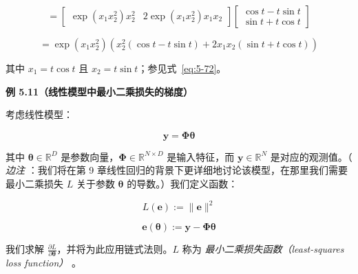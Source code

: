 \begin{notebox}
\begin{equation}
= \begin{bmatrix} \exp(x_1 x_2^2) x_2^2 & 2\exp(x_1 x_2^2) x_1 x_2 \end{bmatrix} \begin{bmatrix} \cos t - t\sin t \\ \sin t + t\cos t \end{bmatrix}
\tag{5.74b}\label{eq:5-74b}
\end{equation}

\begin{equation}
= \exp(x_1 x_2^2) \left( x_2^2(\cos t - t\sin t) + 2x_1 x_2(\sin t + t\cos t) \right)
\tag{5.74c}\label{eq:5-74c}
\end{equation}

其中 $ x_1 = t \cos t $ 且 $ x_2 = t \sin t $；参见式~\eqref{eq:5-72}。
\end{notebox}

\begin{notebox}
\textbf{例 5.11（线性模型中最小二乘损失的梯度）}
\end{notebox}

\begin{notebox}
考虑线性模型：

\begin{equation}
\boldsymbol{y} = \boldsymbol{\Phi} \boldsymbol{\theta}
\tag{5.75}\label{eq:5-75}
\end{equation}

其中 $ \boldsymbol{\theta} \in \mathbb{R}^D $ 是参数向量，$ \boldsymbol{\Phi} \in \mathbb{R}^{N \times D} $ 是输入特征，而 $ \boldsymbol{y} \in \mathbb{R}^N $ 是对应的观测值。（ \emph{边注} ：我们将在第 9 章线性回归的背景下更详细地讨论该模型，在那里我们需要最小二乘损失 $ L $ 关于参数 $ \boldsymbol{\theta} $ 的导数。）我们定义函数：

\begin{equation}
L(\boldsymbol{e}) := \|\boldsymbol{e}\|^2
\tag{5.76}\label{eq:5-76}
\end{equation}

\begin{equation}
\boldsymbol{e}(\boldsymbol{\theta}) := \boldsymbol{y} - \boldsymbol{\Phi} \boldsymbol{\theta}
\tag{5.77}\label{eq:5-77}
\end{equation}

我们求解 $ \frac{\partial L}{\partial \boldsymbol{\theta}} $，并将为此应用链式法则。$ L $ 称为 \emph{最小二乘损失函数（least-squares loss function）} 。
\end{notebox}

